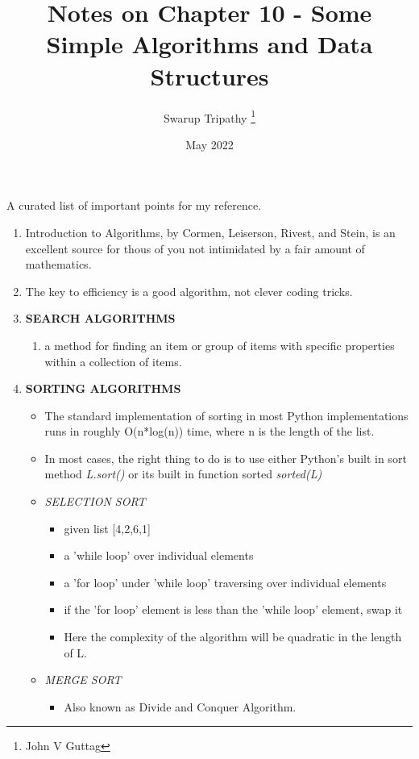 \documentclass[11pt]{article}
\title{Notes on Chapter 10 - Some Simple Algorithms and Data Structures}
\author{Swarup Tripathy \thanks{John V Guttag}}
\date{May 2022}
\begin{document}
    \maketitle
    A curated list of important points for my reference.\\
    \begin{enumerate}
        \item Introduction to Algorithms, by Cormen, Leiserson, Rivest, and Stein, is an excellent source for thous of you not intimidated by a fair amount of mathematics.
        \item The key to efficiency is a good algorithm, not clever coding tricks.
        \item \textbf{SEARCH ALGORITHMS}
        \begin{enumerate}
            \item a method for finding an item or group of items with specific properties within a collection of items.
        \end{enumerate}
        \item \textbf{SORTING ALGORITHMS}
        \begin{itemize}
            \item The standard implementation of sorting in most Python implementations runs in roughly O(n*log(n)) time, where n is the length of the list. 
            \item In most cases, the right thing to do is to use either Python's built in sort method \textit{L.sort()} or its built in function sorted \textit{sorted(L)}
            \item \textit{SELECTION SORT}
            \begin{itemize}
                \item given list [4,2,6,1]
                \item a 'while loop' over individual elements
                \item a 'for loop' under 'while loop' traversing over individual elements
                \item if the 'for loop' element is less than the 'while loop' element, swap it
                \item Here the complexity of the algorithm will be quadratic in the length of L.
            \end{itemize}
            \item \textit{MERGE SORT}
            \begin{itemize}
                \item Also known as Divide and Conquer Algorithm.

\end{itemize}
\end{itemize}
\end{enumerate}
\end{document}
